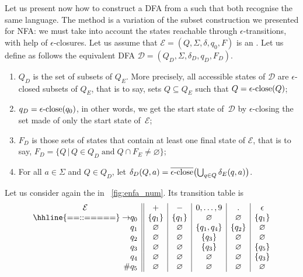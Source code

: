 Let us present now how to construct a DFA from a \eNFA such that both
recognise the same language. The method is a variation of the subset
construction we presented for NFA: we must take into account the
states reachable through \(\epsilon\)-transitions, with help of
\(\epsilon\)-closures. Let us assume that \(\mathcal{E} = (Q, \Sigma,
\delta, q_0, F)\) is an \eNFA. Let us define as follows the equivalent
DFA \(\mathcal{D} = (Q_D, \Sigma, \delta_D, q_D, F_D)\).
\begin{enumerate}

  \item \(Q_D\) is the set of subsets of \(Q_E\). More precisely, all
    accessible states of \(\mathcal{D}\) are \(\epsilon\)-closed
    subsets of \(Q_E\), that is to say, sets \(Q \subseteq Q_E\) such
    that \(Q = \epsilon\text{-close}(Q)\);

  \item \(q_D = \epsilon\text{-close} (q_0)\), in other words, we get the start
    state of~\(\mathcal{D}\) by \(\epsilon\)-closing the set made of
    only the start state of~\(\mathcal{E}\);

  \item \(F_D\) is those sets of states that contain at least one
    final state of \(\mathcal{E}\), that is to say, \(F_D = \{Q \,
    \lvert \, Q \in Q_D \; \text{and} \; Q \cap F_E \neq
    \varnothing\}\);

  \item For all \(a \in \Sigma\) and \(Q \in Q_D\), let \(\delta_D (Q,
    a) = \overline{\epsilon\text{-close}} \bigl(\bigcup_{q \in Q}{\delta_E (q,
      a)}\bigr)\).

\end{enumerate}
Let us consider again the \eNFA in \fig~\vref{fig:enfa_num}. Its
transition table is
\begin{equation*}
\begin{array}{r@{}l||c|c|c|c|c}
\multicolumn{2}{c||}{\mathcal{E}} & + & - & 0, \ldots, 9 & \mathtt{.} &
\epsilon\\
\hhline{==::=====}
\rightarrow & q_0 & \{q_1\} & \{q_1\} & \varnothing & \varnothing 
                  & \{q_1\}\\
            & q_1 & \varnothing  & \varnothing & \{q_1, q_4\} 
                  & \{q_2\} & \varnothing\\
            & q_2 & \varnothing  & \varnothing & \{q_3\} & \varnothing
                  & \varnothing\\
            & q_3 & \varnothing & \varnothing & \{q_3\} & \varnothing
                  & \{q_5\}\\
            & q_4 & \varnothing & \varnothing & \varnothing  
                  & \varnothing & \{q_3\}\\
         \# & q_5 & \varnothing & \varnothing & \varnothing 
                  & \varnothing & \varnothing 
\end{array}
\end{equation*}
